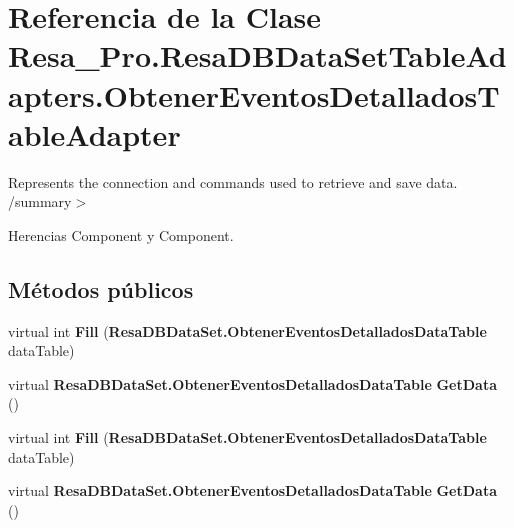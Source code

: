 \section{Referencia de la Clase Resa\+\_\+\+Pro.\+Resa\+D\+B\+Data\+Set\+Table\+Adapters.\+Obtener\+Eventos\+Detallados\+Table\+Adapter}
\label{class_resa___pro_1_1_resa_d_b_data_set_table_adapters_1_1_obtener_eventos_detallados_table_adapter}


Represents the connection and commands used to retrieve and save data. /summary$>$  




Herencias Component y Component.

\subsection*{Métodos públicos}
\begin{DoxyCompactItemize}
\item 
virtual int {\bfseries Fill} ({\bf Resa\+D\+B\+Data\+Set.\+Obtener\+Eventos\+Detallados\+Data\+Table} data\+Table)\label{class_resa___pro_1_1_resa_d_b_data_set_table_adapters_1_1_obtener_eventos_detallados_table_adapter_a93545dd967166e541eecafd9b0538e52}

\item 
virtual {\bf Resa\+D\+B\+Data\+Set.\+Obtener\+Eventos\+Detallados\+Data\+Table} {\bfseries Get\+Data} ()\label{class_resa___pro_1_1_resa_d_b_data_set_table_adapters_1_1_obtener_eventos_detallados_table_adapter_a28f8892d41840c5af06f9e5b4fe807ff}

\item 
virtual int {\bfseries Fill} ({\bf Resa\+D\+B\+Data\+Set.\+Obtener\+Eventos\+Detallados\+Data\+Table} data\+Table)\label{class_resa___pro_1_1_resa_d_b_data_set_table_adapters_1_1_obtener_eventos_detallados_table_adapter_a93545dd967166e541eecafd9b0538e52}

\item 
virtual {\bf Resa\+D\+B\+Data\+Set.\+Obtener\+Eventos\+Detallados\+Data\+Table} {\bfseries Get\+Data} ()\label{class_resa___pro_1_1_resa_d_b_data_set_table_adapters_1_1_obtener_eventos_detallados_table_adapter_a28f8892d41840c5af06f9e5b4fe807ff}

\end{DoxyCompactItemize}

